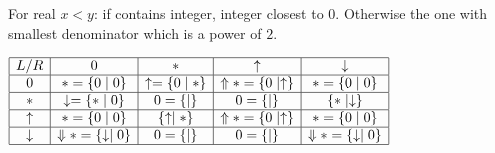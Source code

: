 For real $x<y$: if contains integer, integer closest to $0$. Otherwise the one with smallest denominator which is a power of $2$.

$\begin{array}{|c|c|c|c|c|} \hline L/R & 0 & * & \uparrow & \downarrow \\ \hline 0 & *=\{0 \mid 0\} & \uparrow=\{0 \mid *\} & \Uparrow *=\{0 \mid \uparrow\} & *=\{0 \mid 0\} \\ \hline * & \downarrow=\{* \mid 0\} & 0=\{\mid\} & 0=\{\mid\} & \{* \mid \downarrow\} \\ \hline \uparrow & *=\{0 \mid 0\} & \{\uparrow \mid *\} & \Uparrow *=\{0 \mid \uparrow\} & *=\{0 \mid 0\} \\ \hline \downarrow & \Downarrow *=\{\downarrow \mid 0\} & 0=\{\mid\} & 0=\{\mid\} & \Downarrow *=\{\downarrow \mid 0\} \\ \hline \end{array}$